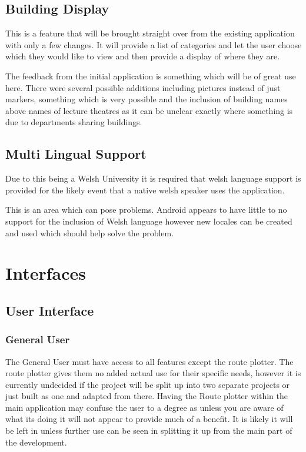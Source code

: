 \subsection{Building Display}
This is a feature that will be brought straight over from the existing application with only a few changes. It will provide a list of categories and let the user choose which they would like to view and then provide a display of where they are. 

The feedback from the initial application is something which will be of great use here. There were several possible additions including pictures instead of just markers, something which is very possible and the inclusion of building names above names of lecture theatres as it can be unclear exactly where something is due to departments sharing buildings. 
\subsection{Multi Lingual Support}
Due to this being a Welsh University it is required that welsh language support is provided for the likely event that a native welsh speaker uses the application.

This is an area which can pose problems. Android appears to have little to no support for the inclusion of Welsh language however new locales can be created and used which should help solve the problem. 

\section{Interfaces}
\subsection{User Interface}
\subsubsection{General User}
The General User must have access to all features except the route plotter. The route plotter gives them no added actual use for their specific needs, however it is currently undecided if the project will be split up into two separate projects or just built as one and adapted from there. Having the Route plotter within the main application may confuse the user to a degree as unless you are aware of what its doing it will not appear to provide much of a benefit. It is likely it will be left in unless further use can be seen in splitting it up from the main part of the development.

